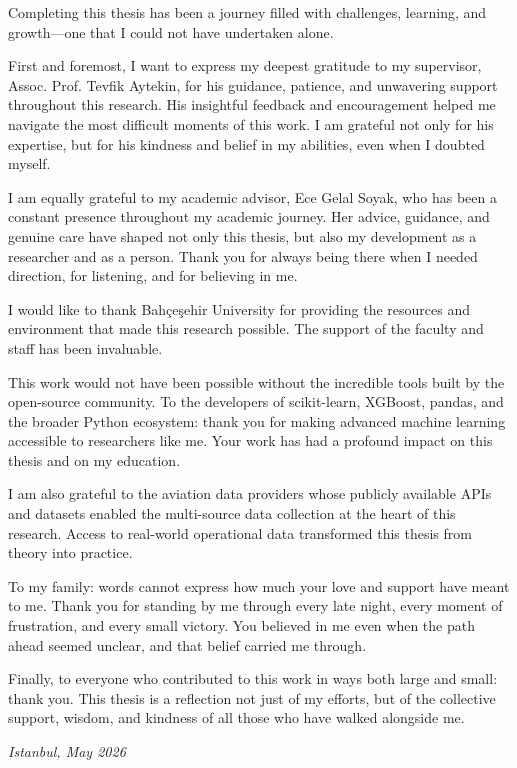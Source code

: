 \documentclass{report}
\begin{document}
Completing this thesis has been a journey filled with challenges, learning, and growth—one that I could not have undertaken alone.

First and foremost, I want to express my deepest gratitude to my supervisor, Assoc. Prof. Tevfik Aytekin, for his guidance, patience, and unwavering support throughout this research. His insightful feedback and encouragement helped me navigate the most difficult moments of this work. I am grateful not only for his expertise, but for his kindness and belief in my abilities, even when I doubted myself.

I am equally grateful to my academic advisor, Ece Gelal Soyak, who has been a constant presence throughout my academic journey. Her advice, guidance, and genuine care have shaped not only this thesis, but also my development as a researcher and as a person. Thank you for always being there when I needed direction, for listening, and for believing in me.

I would like to thank Bahçeşehir University for providing the resources and environment that made this research possible. The support of the faculty and staff has been invaluable.

This work would not have been possible without the incredible tools built by the open-source community. To the developers of scikit-learn, XGBoost, pandas, and the broader Python ecosystem: thank you for making advanced machine learning accessible to researchers like me. Your work has had a profound impact on this thesis and on my education.

I am also grateful to the aviation data providers whose publicly available APIs and datasets enabled the multi-source data collection at the heart of this research. Access to real-world operational data transformed this thesis from theory into practice.

To my family: words cannot express how much your love and support have meant to me. Thank you for standing by me through every late night, every moment of frustration, and every small victory. You believed in me even when the path ahead seemed unclear, and that belief carried me through.


Finally, to everyone who contributed to this work in ways both large and small: thank you. This thesis is a reflection not just of my efforts, but of the collective support, wisdom, and kindness of all those who have walked alongside me.

\vspace{1cm}
\begin{flushright}
\textit{Istanbul, May 2026}
\end{flushright}
\end{document}
